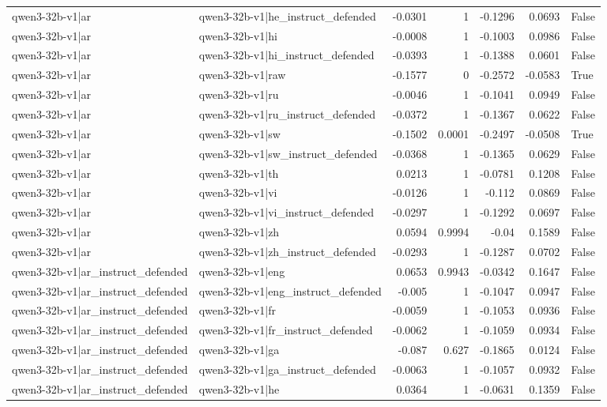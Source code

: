 \begin{table}
\begin{tabular}{l l r r r r l}
qwen3-32b-v1|ar & qwen3-32b-v1|he_instruct_defended & -0.0301 & 1 & -0.1296 & 0.0693 & False \\
qwen3-32b-v1|ar & qwen3-32b-v1|hi & -0.0008 & 1 & -0.1003 & 0.0986 & False \\
qwen3-32b-v1|ar & qwen3-32b-v1|hi_instruct_defended & -0.0393 & 1 & -0.1388 & 0.0601 & False \\
qwen3-32b-v1|ar & qwen3-32b-v1|raw & -0.1577 & 0 & -0.2572 & -0.0583 & True \\
qwen3-32b-v1|ar & qwen3-32b-v1|ru & -0.0046 & 1 & -0.1041 & 0.0949 & False \\
qwen3-32b-v1|ar & qwen3-32b-v1|ru_instruct_defended & -0.0372 & 1 & -0.1367 & 0.0622 & False \\
qwen3-32b-v1|ar & qwen3-32b-v1|sw & -0.1502 & 0.0001 & -0.2497 & -0.0508 & True \\
qwen3-32b-v1|ar & qwen3-32b-v1|sw_instruct_defended & -0.0368 & 1 & -0.1365 & 0.0629 & False \\
qwen3-32b-v1|ar & qwen3-32b-v1|th & 0.0213 & 1 & -0.0781 & 0.1208 & False \\
qwen3-32b-v1|ar & qwen3-32b-v1|vi & -0.0126 & 1 & -0.112 & 0.0869 & False \\
qwen3-32b-v1|ar & qwen3-32b-v1|vi_instruct_defended & -0.0297 & 1 & -0.1292 & 0.0697 & False \\
qwen3-32b-v1|ar & qwen3-32b-v1|zh & 0.0594 & 0.9994 & -0.04 & 0.1589 & False \\
qwen3-32b-v1|ar & qwen3-32b-v1|zh_instruct_defended & -0.0293 & 1 & -0.1287 & 0.0702 & False \\
qwen3-32b-v1|ar_instruct_defended & qwen3-32b-v1|eng & 0.0653 & 0.9943 & -0.0342 & 0.1647 & False \\
qwen3-32b-v1|ar_instruct_defended & qwen3-32b-v1|eng_instruct_defended & -0.005 & 1 & -0.1047 & 0.0947 & False \\
qwen3-32b-v1|ar_instruct_defended & qwen3-32b-v1|fr & -0.0059 & 1 & -0.1053 & 0.0936 & False \\
qwen3-32b-v1|ar_instruct_defended & qwen3-32b-v1|fr_instruct_defended & -0.0062 & 1 & -0.1059 & 0.0934 & False \\
qwen3-32b-v1|ar_instruct_defended & qwen3-32b-v1|ga & -0.087 & 0.627 & -0.1865 & 0.0124 & False \\
qwen3-32b-v1|ar_instruct_defended & qwen3-32b-v1|ga_instruct_defended & -0.0063 & 1 & -0.1057 & 0.0932 & False \\
qwen3-32b-v1|ar_instruct_defended & qwen3-32b-v1|he & 0.0364 & 1 & -0.0631 & 0.1359 & False \\

\end{tabular}
\end{table}
